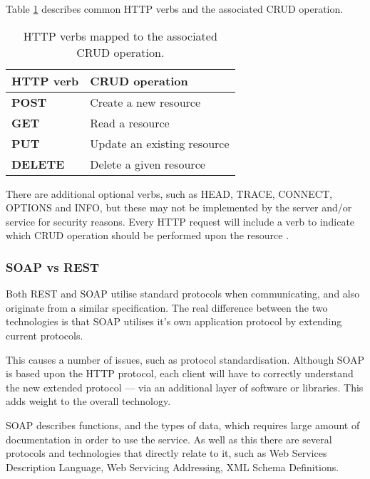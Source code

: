 Table \ref{tbl:http_crud} describes common HTTP verbs and the associated CRUD 
operation. 

\begin{table}[h!]
  \begin{center}
    \begin{tabular}{|ll|}
    \hline
    \textbf{HTTP verb} & \textbf{CRUD operation}      \\ \hline
    \textbf{POST}      & Create a new resource        \\
    \textbf{GET}       & Read a resource              \\
    \textbf{PUT}       & Update an existing resource  \\
    \textbf{DELETE}    & Delete a given resource      \\ \hline
    \end{tabular}
    \caption{HTTP verbs mapped to the associated CRUD operation.}
    \label{tbl:http_crud}
  \end{center}
\end{table}

There are additional optional verbs, such as HEAD, TRACE, CONNECT, OPTIONS and 
INFO, but these may not be implemented by the server and/or service for security
reasons. Every HTTP request will include a verb to indicate which CRUD operation
should be performed upon the resource \citep{dospinescu13}. 


\subsubsection{SOAP vs REST}

Both REST and SOAP utilise standard protocols when communicating, and also 
originate from a similar specification. The real difference between the two 
technologies is that SOAP utilises it's own application protocol by extending 
current protocols.

This causes a number of issues, such as protocol standardisation. Although SOAP
is based upon the HTTP protocol, each client will have to correctly understand 
the new extended protocol --- via an additional layer of software or libraries.
This adds weight to the overall technology.

SOAP describes functions, and the types of data, which requires large amount of
documentation in order to use the service. As well as this there are several 
protocols and technologies that directly relate to it, such as Web Services 
Description Language, Web Servicing Addressing, XML Schema Definitions.

